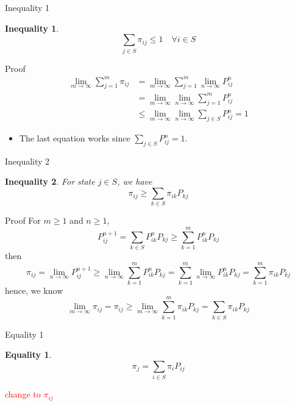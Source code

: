 \documentclass[mathserif]{beamer}
\newtheorem{ineq}{Inequality}
\newtheorem{eq}{Equality}
\begin{document}
\begin{frame}{Inequality 1}
	\begin{ineq}
		\[
		\sum_{j \in S} \pi_{ij} \leq 1 \quad\forall i \in S
		\]
	\end{ineq}
\end{frame}

\begin{frame}{Proof}
		\begin{align*}
			\lim_{m \to \infty} \sum_{j=1}^m \pi_{ij} &= \lim_{m \to \infty} \sum_{j=1}^m \lim_{n \to \infty} P^n_{ij} \\
			&= \lim_{m \to \infty} \lim_{n \to \infty} \sum_{j=1}^m P^n_{ij} \\
			&\leq \lim_{m \to \infty} \lim_{n \to \infty} \sum_{j \in S} P^n_{ij} = 1
		\end{align*}
	\begin{itemize}
		\item The last equation works since $\sum_{j \in S} P^n_{ij} = 1$.
	\end{itemize}
\end{frame}

\begin{frame}{Inequality 2}
	\begin{ineq}
		For state $j \in S$, we have
		\[
		\pi_{ij} \geq \sum_{k \in S} \pi_{ik} P_{kj}
		\]
	\end{ineq}
\end{frame}

\begin{frame}{Proof}
	For $m \geq 1$ and $n \geq 1$,
	\[
	P^{n+1}_{ij} = \sum_{k \in S} P^n_{ik} P_{kj} \geq \sum_{k=1}^m P^n_{ik} P_{kj}
	\]
	then
	\[
	\pi_{ij} = \lim_{n \to \infty} P^{n+1}_{ij}
		\geq \lim_{n \to \infty} \sum_{k=1}^m P^n_{ik} P_{kj} 
		 = \sum_{k=1}^m \lim_{n \to \infty} P^n_{ik} P_{kj} 
		 = \sum_{k=1}^m \pi_{ik} P_{kj}
	\]
	hence, we know
	\[
	\lim_{m\to\infty} \pi_{ij} = \pi_{ij} \geq 
	\lim_{m\to\infty}\sum_{k=1}^m \pi_{ik}P_{kj} = \sum_{k\in S} \pi_{ik}P_{kj}
	\]
\end{frame}

\begin{frame}{Equality 1}
	\begin{eq}
		\[
		\pi_{j} = \sum_{i \in S} \pi_{i} P_{ij}
		\]
	\end{eq}
	\textcolor{red}{change to $\pi_{ij}$}
\end{frame}
\end{document}
